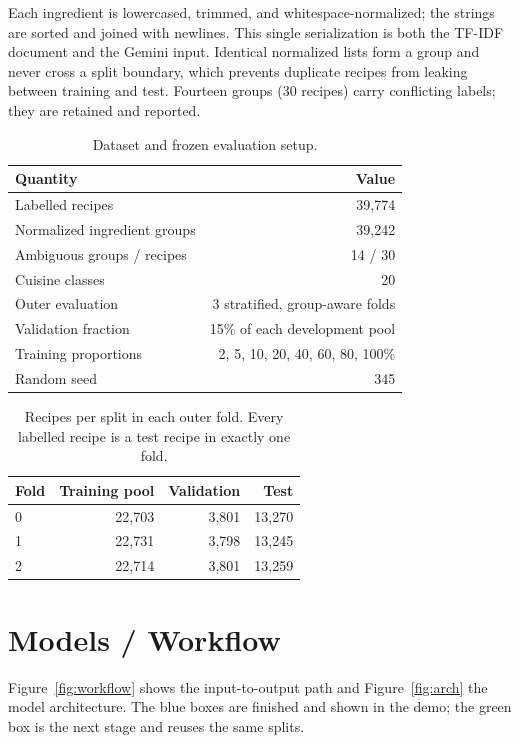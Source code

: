 \documentclass[11pt,letterpaper]{article}
\newcommand{\tfidf}{TF-IDF}
\begin{document}
Each ingredient is lowercased, trimmed, and whitespace-normalized; the strings are sorted and joined with newlines. This single serialization is both the \tfidf{} document and the Gemini input. Identical normalized lists form a group and never cross a split boundary, which prevents duplicate recipes from leaking between training and test. Fourteen groups (30 recipes) carry conflicting labels; they are retained and reported.

\begin{table}[H]
\centering
\caption{Dataset and frozen evaluation setup.}
\label{tab:data}
\small
\begin{tabular}{@{}lr@{}}
\toprule
Quantity & Value \\
\midrule
Labelled recipes & 39,774 \\
Normalized ingredient groups & 39,242 \\
Ambiguous groups / recipes & 14 / 30 \\
Cuisine classes & 20 \\
Outer evaluation & 3 stratified, group-aware folds \\
Validation fraction & 15\% of each development pool \\
Training proportions & 2, 5, 10, 20, 40, 60, 80, 100\% \\
Random seed & 345 \\
\bottomrule
\end{tabular}
\end{table}

\begin{table}[H]
\centering
\caption{Recipes per split in each outer fold. Every labelled recipe is a test recipe in exactly one fold.}
\label{tab:folds}
\small
\begin{tabular}{@{}lrrr@{}}
\toprule
Fold & Training pool & Validation & Test \\
\midrule
0 & 22,703 & 3,801 & 13,270 \\
1 & 22,731 & 3,798 & 13,245 \\
2 & 22,714 & 3,801 & 13,259 \\
\bottomrule
\end{tabular}
\end{table}

\section{Models / Workflow}
Figure~\ref{fig:workflow} shows the input-to-output path and Figure~\ref{fig:arch} the model architecture. The blue boxes are finished and shown in the demo; the green box is the next stage and reuses the same splits.
\end{document}

